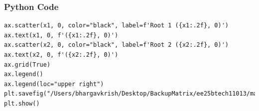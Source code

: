 \documentclass{beamer}
\begin{document}
\begin{frame}[fragile]
    \frametitle{Python Code}
    \begin{lstlisting}
ax.scatter(x1, 0, color="black", label=f'Root 1 ({x1:.2f}, 0)') 
ax.text(x1, 0, f'({x1:.2f}, 0)')
ax.scatter(x2, 0, color="black", label=f'Root 2 ({x2:.2f}, 0)') 
ax.text(x2, 0, f'({x2:.2f}, 0)')
ax.grid(True)
ax.legend() 
ax.legend(loc="upper right")
plt.savefig("/Users/bhargavkrish/Desktop/BackupMatrix/ee25btech11013/matgeo/9.4.25/figs/Figure_1.png")
plt.show()


    \end{lstlisting}
\end{frame}
\end{document}
